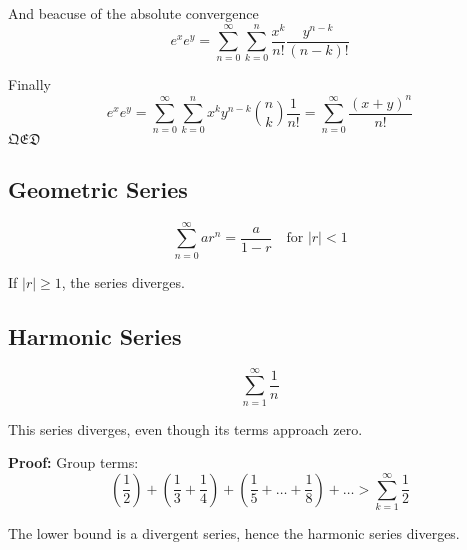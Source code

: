 And beacuse of the absolute convergence
\[
  e^x e^y = \sum_{n = 0}^{\infty}\sum_{k = 0}^{n} \frac{x^k}{n!} \frac{y^{n - k}}{(n-k)!}
\]

Finally
\[
  e^x e^y = \sum_{n = 0}^{\infty}\sum_{k = 0}^{n}x^k y^{n - k} \binom{n}{k} \frac{1}{n!} = \sum_{n = 0}^{\infty} \frac{(x + y)^n}{n!}
\]
\(\mathfrak{QED}\)
\subsection{Geometric Series}

\[
\sum_{n=0}^\infty ar^n = \frac{a}{1 - r} \quad \text{for } |r| < 1
\]

If \(|r| \ge 1\), the series diverges.

\subsection{Harmonic Series}

\[
\sum_{n=1}^{\infty} \frac{1}{n}
\]

This series diverges, even though its terms approach zero.

\textbf{Proof:} Group terms:
\[
\left(\frac{1}{2}\right) + \left(\frac{1}{3} + \frac{1}{4}\right) + \left(\frac{1}{5} + \dots + \frac{1}{8}\right) + \dots > \sum_{k=1}^\infty \frac{1}{2}
\]

The lower bound is a divergent series, hence the harmonic series diverges.

\newpage